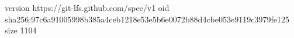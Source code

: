 version https://git-lfs.github.com/spec/v1
oid sha256:97c6a91005998b385a4ceb1218e53e5b6e0072b88d4cbe053e9119c3979fe125
size 1104
